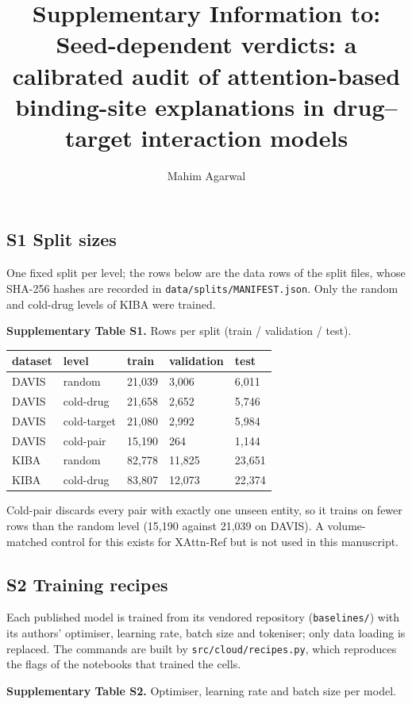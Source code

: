 \documentclass[
  10pt,
]{article}
\title{Supplementary Information to: Seed-dependent verdicts: a calibrated audit of attention-based binding-site explanations in drug--target interaction models}
\author{Mahim Agarwal}
\date{}
\begin{document}
\maketitle

\subsection{S1 Split sizes}\label{s1-split-sizes}

One fixed split per level; the rows below are the data rows of the split files, whose SHA-256 hashes are recorded in \texttt{data/splits/MANIFEST.json}. Only the random and cold-drug levels of KIBA were trained.

\textbf{Supplementary Table S1.} Rows per split (train / validation / test).

\begin{longtable}[]{@{}lllll@{}}
\toprule\noalign{}
dataset & level & train & validation & test \\
\midrule\noalign{}
\endhead
\bottomrule\noalign{}
\endlastfoot
DAVIS & random & 21,039 & 3,006 & 6,011 \\
DAVIS & cold-drug & 21,658 & 2,652 & 5,746 \\
DAVIS & cold-target & 21,080 & 2,992 & 5,984 \\
DAVIS & cold-pair & 15,190 & 264 & 1,144 \\
KIBA & random & 82,778 & 11,825 & 23,651 \\
KIBA & cold-drug & 83,807 & 12,073 & 22,374 \\
\end{longtable}

Cold-pair discards every pair with exactly one unseen entity, so it trains on fewer rows than the random level (15,190 against 21,039 on DAVIS). A volume-matched control for this exists for XAttn-Ref but is not used in this manuscript.

\subsection{S2 Training recipes}\label{s2-training-recipes}

Each published model is trained from its vendored repository (\texttt{baselines/}) with its authors' optimiser, learning rate, batch size and tokeniser; only data loading is replaced. The commands are built by \texttt{src/cloud/recipes.py}, which reproduces the flags of the notebooks that trained the cells.

\textbf{Supplementary Table S2.} Optimiser, learning rate and batch size per model.
\end{document}
